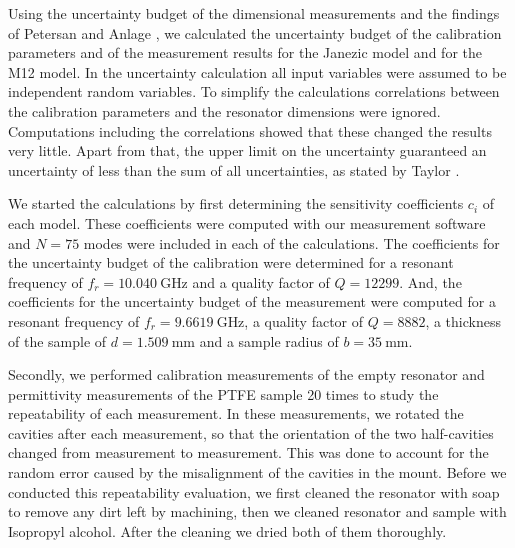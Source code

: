 Using the uncertainty budget of the dimensional measurements and the findings of Petersan and Anlage \cite{petersan}, we calculated the uncertainty budget of the calibration parameters and of the measurement results for the Janezic model and for the M12 model. In the uncertainty calculation all input variables were assumed to be independent random variables. To simplify the calculations correlations between the calibration parameters and the resonator dimensions were ignored. Computations including the correlations showed that these changed the results very little. Apart from that, the upper limit on the uncertainty guaranteed an uncertainty of less than the sum of all uncertainties, as stated by Taylor \cite[Sec. 9.2]{taylor}. 

We started the calculations by first determining the sensitivity coefficients $c_i$ of each model. These coefficients were computed with our measurement software and $N=75$ modes were included in each of the calculations. The coefficients for the uncertainty budget of the calibration were determined for a resonant frequency of $f_r=\SI{10.040}{\giga\hertz}$ and a quality factor of $Q=\num{12299}$. And, the coefficients for the uncertainty budget of the measurement were computed for a resonant frequency of $f_r=\SI{9.6619}{\giga\hertz}$, a quality factor of $Q=\num{8882}$, a thickness of the sample of $d=\SI{1.509}{\milli\meter}$ and a sample radius of $b=\SI{35}{\milli\meter}$. 

Secondly, we performed calibration measurements of the empty resonator and permittivity measurements of the PTFE sample 20 times to study the repeatability of each measurement. In these measurements, we rotated the cavities after each measurement, so that the orientation of the two half-cavities changed from measurement to measurement. This was done to account for the random error caused by the misalignment of the cavities in the mount. Before we conducted this repeatability evaluation, we first cleaned the resonator with soap to remove any dirt left by machining, then we cleaned resonator and sample with Isopropyl alcohol. After the cleaning we dried both of them thoroughly. 

